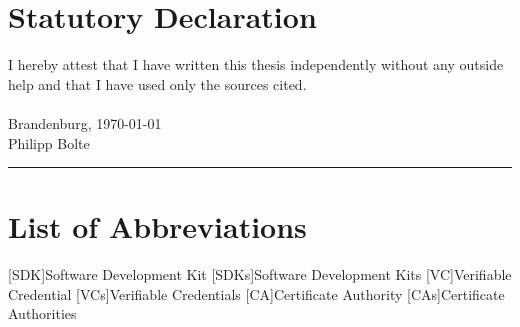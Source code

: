 
\usepackage[utf8]{inputenc}

\newcommand*{\mytitle}{Self-sovereign Identity: \\Development of an Implementation-based Evaluation Framework for Verifiable Credential SDKs} %
\newcommand*{\myinstitute}{Brandenburg University of Applied Sciences} %
\newcommand*{\myfaculty}{Department of Economics} %
\newcommand*{\myauthor}{Philipp Bolte} %
\newcommand*{\myreporttype}{Master's Thesis} %
\newcommand*{\mydate}{\today} %




	
\pagestyle{empty}

\newpage 					%
\thispagestyle{empty}
\quad 
\newpage
{}
 
\cleardoubleoddpage


\chapter*{Statutory Declaration}
I hereby attest that I have written this thesis independently without any outside help and that I have used only the sources cited. \\~\\
Brandenburg, \today\\[.6cm]
Philipp Bolte\\
\rule[0.5em]{20em}{0.5pt}



\tableofcontents			%
\listoffigures				%
\listoftables				%
\chapter*{List of Abbreviations}
    \begin{acronym}[SDK]
        [SDK]{Software Development Kit}
        [SDKs]{Software Development Kits}
        [VC]{Verifiable Credential}
        [VCs]{Verifiable Credentials}
        [CA]{Certificate Authority}
        [CAs]{Certificate Authorities}
    \end{acronym}

